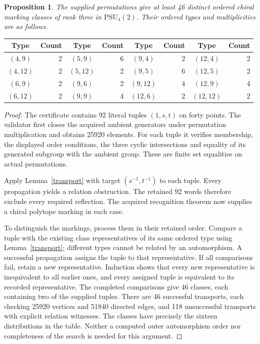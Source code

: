 \documentclass[11pt,a4paper]{article}
\newtheorem{proposition}[lemma]{Proposition}
\begin{document}
\begin{proposition}
The supplied permutations give at least 46 distinct ordered chiral
marking classes of rank three in $\mathrm{PSU}_4(2)$. Their ordered
types and multiplicities are as follows.
\end{proposition}
\begin{center}
\begin{tabular}{cr@{\qquad}cr@{\qquad}cr@{\qquad}cr}
\toprule Type&Count&Type&Count&Type&Count&Type&Count\\\midrule
$(4,9)$&2&$(5,9)$&6&$(9,4)$&2&$(12,4)$&2\\
$(4,12)$&2&$(5,12)$&2&$(9,5)$&6&$(12,5)$&2\\
$(6,9)$&2&$(9,6)$&2&$(9,12)$&4&$(12,9)$&4\\
$(6,12)$&2&$(9,9)$&4&$(12,6)$&2&$(12,12)$&2\\\bottomrule
\end{tabular}
\end{center}
\begin{proof}
The certificate contains 92 literal tuples $(1,s,t)$ on forty points.
The validator first closes the acquired ambient generators under
permutation multiplication and obtains 25920 elements. For each tuple
it verifies membership, the displayed order conditions, the three
cyclic intersections and equality of its generated subgroup with the
ambient group. These are finite set equalities on actual permutations.

Apply Lemma~\ref{transport} with target $(s^{-1},t^{-1})$ to each
tuple. Every propagation yields a relation obstruction. The retained
92 words therefore exclude every required reflection. The acquired
recognition theorem now supplies a chiral polytope marking in each case.

To distinguish the markings, process them in their retained order.
Compare a tuple with the existing class representatives of its same
ordered type using Lemma~\ref{transport}; different types cannot be
related by an automorphism. A successful propagation assigns the tuple
to that representative. If all comparisons fail, retain a new
representative. Induction shows that every new representative is
inequivalent to all earlier ones, and every assigned tuple is equivalent
to its recorded representative. The completed comparisons give 46
classes, each containing two of the supplied tuples. There are 46
successful transports, each checking 25920 vertices and 51840 directed
edges, and 118 unsuccessful transports with explicit relation witnesses.
The classes have precisely the sixteen distributions in the table.
Neither a computed outer automorphism order nor completeness of the
search is needed for this argument.
\end{proof}
\end{document}
